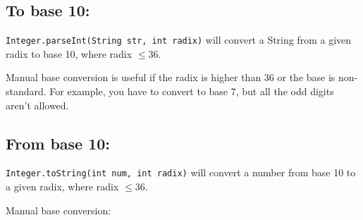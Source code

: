 
\subsection*{To base 10:}

\lstinline[style=inline]{Integer.parseInt(String str, int radix)} will convert a String from a given radix to base 10, where radix $\leq 36$.

Manual base conversion is useful if the radix is higher than 36 or the base is non-standard. For example, you have to convert to base 7, but all the odd digits aren't allowed.



\subsection*{From base 10:}

\lstinline[style=inline]{Integer.toString(int num, int radix)} will convert a number from base 10 to a given radix, where radix $\leq 36$.

Manual base conversion:


\newpage